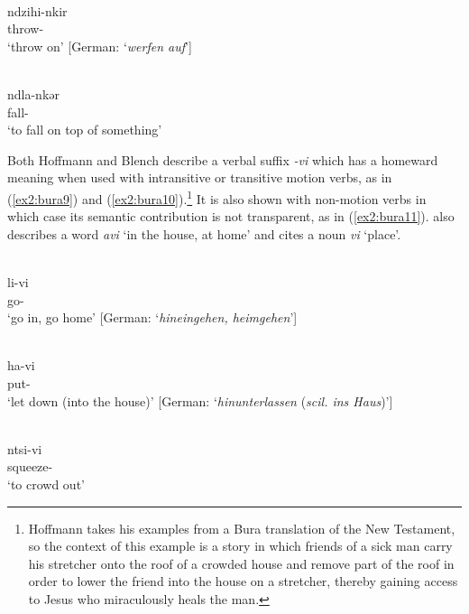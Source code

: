 \ea\label{ex2:bura7}
 \\
\gll ndzihi-nkir \\
throw- \\
\glt `throw on' [German: `\textit{werfen auf}']

\ex\label{ex2:bura8}
 \\
\gll ndla-nkər \\
fall- \\
\glt `to fall on top of something'
\z 

Both Hoffmann and Blench describe a verbal suffix \textit{-vi} which has a homeward meaning when used with intransitive or transitive motion verbs, as in (\ref{ex2:bura9}) and (\ref{ex2:bura10}).\footnote{Hoffmann takes his examples from a Bura translation of the New Testament, so the context of this example is a story in which friends of a sick man carry his stretcher onto the roof of a crowded house and remove part of the roof in order to lower the friend into the house on a stretcher, thereby gaining access to Jesus who miraculously heals the man.} It is also shown with non-motion verbs in which case its semantic contribution is not transparent, as in (\ref{ex2:bura11}). \citet[301]{hoffmannUntersuchungenZurStruktur1955} also describes a word \textit{avi} `in the house, at home' and \citet[7]{blenchBuraVerbalExtensions2010} cites a noun \textit{vi} `place'. 

\ea\label{ex2:bura9}
 \\
\gll li-vi \\
go- \\
\glt `go in, go home' [German: `\textit{hineingehen, heimgehen}']

\ex\label{ex2:bura10}
 \\
\gll ha-vi \\ 
put- \\
\glt `let down (into the house)' [German: `\textit{hinunterlassen} (\textit{scil. ins Haus})']

\ex\label{ex2:bura11}
 \\
\gll ntsi-vi \\
squeeze-\\
\glt `to crowd out'
\z


